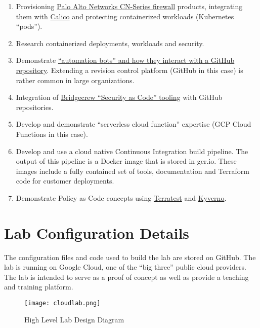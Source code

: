 \begin{raggedright}
	\begin{enumerate}
		\item Provisioning \href{https://docs.paloaltonetworks.com/cn-series.html}{Palo Alto Networks CN-Series firewall} products, integrating
		them with \href{https://www.tigera.io/project-calico/}{Calico} and protecting containerized workloads (Kubernetes ``pods'').
		\item Research containerized deployments, workloads and security.
		\item Demonstrate \href{https://github.com/probot/probot}{``automation bots'' and how they interact with a GitHub repository}. Extending a
		revision control platform (GitHub in this case) is rather common in large organizations.
		\item Integration of \href{https://docs.bridgecrew.io/docs}{Bridgecrew ``Security as Code'' tooling} with GitHub repositories.
		\item Develop and demonstrate ``serverless cloud function'' expertise (GCP Cloud Functions in this case).
		\item Develop and use a cloud native Continuous Integration build pipeline. The output of this pipeline is a Docker image that is stored
		in gcr.io. These images include a fully contained set of tools, documentation and Terraform code for customer deployments.
		\item Demonstrate Policy as Code concepts using \href{https://www.accurics.com/products/terrascan/}{Terratest} and 
		\href{https://kyverno.io/}{Kyverno}.
	\end{enumerate}
\end{raggedright}
\vspace{2mm}

\section{\label{sec:Lab}Lab Configuration Details}
\vspace{2mm}
\justifying
The configuration files and code used to build the lab are stored on GitHub. The lab is running on Google Cloud, one of the ``big three'' public cloud providers.
The lab is intended to serve as a proof of concept as well as provide a teaching and training platform.

\begin{figure}[ht]
  \texttt{[image: cloudlab.png]}
  \caption{High Level Lab Design Diagram}
  \label{design}
\end{figure}


